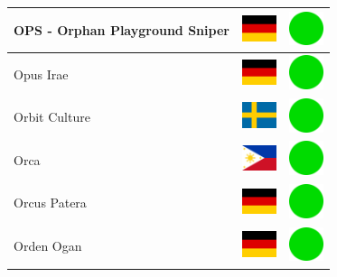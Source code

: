 \documentclass[12pt, a4paper, twoside]{report}
\begin{document}
\begin{center}
\begin{longtable}{|p{5cm}|p{2cm}|p{2cm}|}
 OPS - Orphan Playground Sniper                             & \includegraphics[width=1cm]{../img/flags/de} &   \includegraphics[width=1cm]{../likes/y} \\ \hline
 Opus Irae                                                  & \includegraphics[width=1cm]{../img/flags/de} &   \includegraphics[width=1cm]{../likes/y} \\ \hline
 Orbit Culture                                              & \includegraphics[width=1cm]{../img/flags/se} &   \includegraphics[width=1cm]{../likes/y} \\ \hline
 Orca                                                       & \includegraphics[width=1cm]{../img/flags/ph} &   \includegraphics[width=1cm]{../likes/y} \\ \hline
 Orcus Patera                                               & \includegraphics[width=1cm]{../img/flags/de} &   \includegraphics[width=1cm]{../likes/y} \\ \hline
 Orden Ogan                                                 & \includegraphics[width=1cm]{../img/flags/de} &   \includegraphics[width=1cm]{../likes/y} \\ \hline

\end{longtable}
\end{center}
\end{document}
